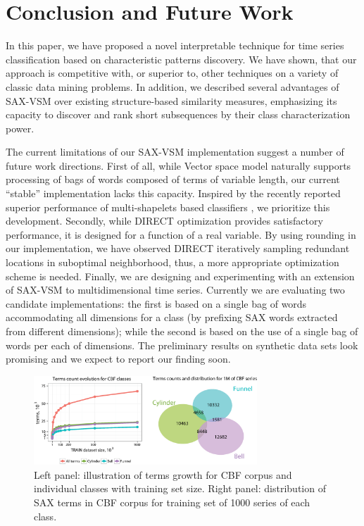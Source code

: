 \documentclass[conference]{IEEEtran}
\newcommand{\myfigureshrinker}{\vspace{0.05cm}}
\begin{document}
\section{Conclusion and Future Work} \label{conclusion}
In this paper, we have proposed a novel interpretable technique for time series classification
based on characteristic patterns discovery. We have shown, that our approach is competitive with, 
or superior to, other techniques on a variety of classic data mining problems. In addition, 
we described several advantages of SAX-VSM over existing structure-based similarity measures,
emphasizing its capacity to discover and rank short subsequences by their class characterization
power.

The current limitations of our SAX-VSM implementation suggest a number of future work directions. 
First of all, while Vector space model naturally supports processing of bags of words composed 
of terms of variable length, our current ``stable'' implementation lacks this capacity.
Inspired by the recently reported superior performance of multi-shapelets based classifiers
\cite{bagnal}, we prioritize this development.
Secondly, while DIRECT optimization provides satisfactory performance, it is designed for a 
function of a real variable. By using rounding in our implementation, we have observed DIRECT 
iteratively sampling redundant locations in suboptimal neighborhood, thus, a more appropriate 
optimization scheme is needed.
Finally, we are designing and experimenting with an extension of SAX-VSM to multidimensional time
series. Currently we are evaluating two candidate implementations: the first is based on a
single bag of words accommodating all dimensions for a class (by prefixing SAX words extracted from
different dimensions); while the second is based on the use of a single bag of words per each of
dimensions. The preliminary results on synthetic data sets look promising and we expect to report 
our finding soon.

\begin{figure}[t]
   \myfigureshrinker
   \centering
   \includegraphics[width=84mm]{figures/bubbles.eps}
   \caption{Left panel: illustration of terms growth for CBF corpus and individual classes with 
   training set size. Right panel: distribution of SAX terms in CBF corpus for training set of 
   1000 series of each class.}
   \label{fig:venn}
\end{figure}
\end{document}
